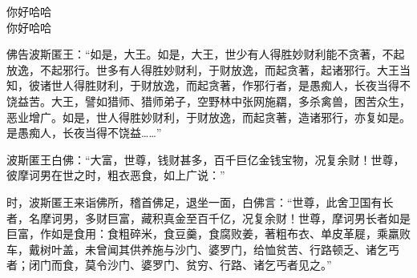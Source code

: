 \documentclass{article}
\begin{document}
    你好哈哈    \\
    你好哈哈    
    
    佛告波斯匿王：“如是，大王。如是，大王，世少有人得胜妙财利能不贪著，不起放逸，不起邪行。世多有人得胜妙财利，于财放逸，而起贪著，起诸邪行。大王当知，彼诸世人得胜财利，于财放逸，而起贪著，作邪行者，是愚痴人，长夜当得不饶益苦。大王，譬如猎师、猎师弟子，空野林中张网施羂，多杀禽兽，困苦众生，恶业增广。如是，世人得胜妙财利，于财放逸，而起贪著，造诸邪行，亦复如是。是愚痴人，长夜当得不饶益……”

    波斯匿王白佛：“大富，世尊，钱财甚多，百千巨亿金钱宝物，况复余财！世尊，彼摩诃男在世之时，粗衣恶食，如上广说：”

    时，波斯匿王来诣佛所，稽首佛足，退坐一面，白佛言：“世尊，此舍卫国有长者，名摩诃男，多财巨富，藏积真金至百千亿，况复余财！世尊，摩诃男长者如是巨富，作如是食用：食粗碎米，食豆羹，食腐败姜，著粗布衣、单皮革屣，乘羸败车，戴树叶盖，未曾闻其供养施与沙门、婆罗门，给恤贫苦、行路顿乏、诸乞丐者；闭门而食，莫令沙门、婆罗门、贫穷、行路、诸乞丐者见之。”
\end{document}
